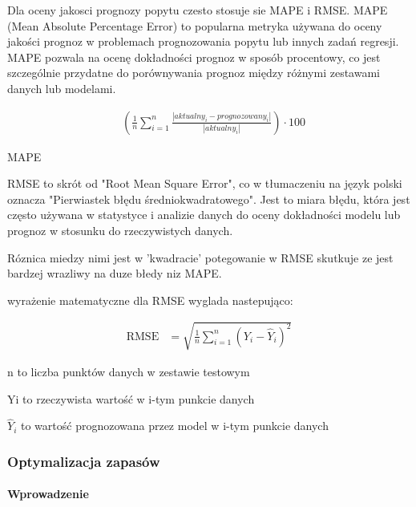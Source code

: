\cite{carb2006}\cite{Mary2022}\cite{wikknn2023}\cite{Shekh2018}\cite{Xiao2021}\cite{Resul2017}\cite{Farz2020}\cite{Carbo2007}\cite{Shahr2009}\cite{Gail2020}




Dla oceny jakosci prognozy popytu  czesto stosuje sie MAPE i RMSE.
MAPE (Mean Absolute Percentage Error) to popularna metryka używana do oceny jakości prognoz w problemach prognozowania popytu lub innych zadań regresji. MAPE pozwala na ocenę dokładności prognoz w sposób procentowy, co jest szczególnie przydatne do porównywania prognoz między różnymi zestawami danych lub modelami.


\begin{align*}
& \left( \frac{1}{n} \sum_{i=1}^{n} \frac{|aktualny_i - prognozowany_i|}{|aktualny_i|} \right) \cdot 100
\end{align*}

MAPE \cite{Shekh2018}


RMSE to skrót od "Root Mean Square Error", co w tłumaczeniu na język polski oznacza "Pierwiastek błędu średniokwadratowego". Jest to miara błędu, która jest często używana w statystyce i analizie danych do oceny dokładności modelu lub prognoz w stosunku do rzeczywistych danych.

Róznica miedzy nimi jest w 'kwadracie' potegowanie w RMSE skutkuje ze jest bardzej wrazliwy na duze błedy niz MAPE.



wyrażenie matematyczne dla RMSE wyglada nastepująco:

\begin{align*}
\text{RMSE} &= \sqrt{\frac{1}{n} \sum_{i=1}^{n} (Y_i - \hat{Y}_i)^2}
\end{align*}

n to liczba punktów danych w zestawie testowym

Yi to rzeczywista wartość w i-tym punkcie danych

\(\hat{Y}_i\) to wartość prognozowana przez model w i-tym punkcie danych



\newpage
\subsubsection{Optymalizacja zapasów}

\paragraph{Wprowadzenie}


